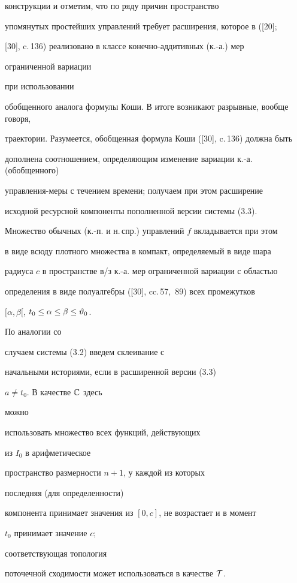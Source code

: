 конструкции и отметим, что по ряду причин пространство


упомянутых простейших управлений требует расширения, которое в ([20];


[30], c.\,136) реализовано в классе конечно-аддитивных (к.-а.) мер


ограниченной вариации


при использовании


обобщенного аналога формулы Коши. В итоге возникают разрывные, вообще говоря,


траектории. Разумеется, обобщенная формула Коши ([30], c.\,136) должна быть


дополнена соотношением, определяющим изменение вариации к.-а. (обобщенного)


управления-меры с течением времени; получаем при этом расширение


исходной ресурсной компоненты пополненной версии системы (3.3).


Множество обычных (к.-п. и н.\,спр.) управлений $f$ вкладывается при этом


в виде всюду плотного множества в компакт, определяемый в виде шара


радиуса $c$ в пространстве в/з к.-а. мер ограниченной вариации с областью


определения в виде полуалгебры ([30], cc.\,57,~89) всех промежутков


$[{\alpha},{\beta}[$, ${t_0} \le \alpha \le \beta \le {{\vartheta}_0}$.


По аналогии со


случаем системы (3.2) введем склеивание с


начальными историями, если в расширенной версии (3.3)


$a \ne {t_0}$. В качестве ${\Bbb C}$ здесь


можно


использовать множество всех функций, действующих


из ${I_0}$ в арифметическое


пространство размерности $n + 1$, у каждой из которых


последняя (для определенности)


компонента принимает значения из $[0,c]$, не возрастает и в момент


$t_0$ принимает значение $c$;


соответствующая топология


поточечной сходимости может использоваться в качестве ${\cal T}$.





